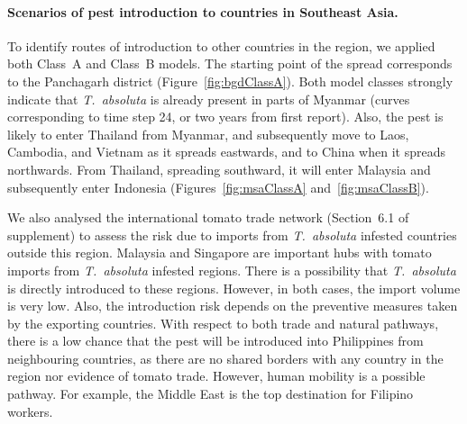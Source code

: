 \documentclass[11pt]{article}
\newcommand{\tuta}{\emph{T.~absoluta}}
\theoremstyle{definition}
\begin{document}
\paragraph{Scenarios of pest introduction to countries in Southeast Asia.}
To identify routes of introduction to other countries in the region, we
applied both Class~A and Class~B models. The starting point of the spread
corresponds to the Panchagarh district (Figure~\ref{fig:bgdClassA}). Both model
classes strongly indicate that \tuta{} is already present in parts of
Myanmar (curves corresponding to time step 24, or two years from first
report). Also, the pest is likely to enter Thailand from Myanmar, and
subsequently move to Laos, Cambodia, and Vietnam as it spreads eastwards, and
to China when it spreads northwards. From Thailand, spreading southward, it
will enter Malaysia and subsequently enter Indonesia
(Figures~\ref{fig:msaClassA} and~\ref{fig:msaClassB}).


We also analysed the international tomato trade network
(Section~6.1 of supplement) to assess the risk due to
imports from \tuta{} infested countries outside this region.  Malaysia and
Singapore are important hubs with tomato imports from \tuta{} infested
regions. There is a possibility that \tuta{} is directly introduced to
these regions.  However, in both cases, the import volume is very low.
Also, the introduction risk depends on the preventive measures taken by the
exporting countries. With respect to both trade and natural pathways, there
is a low chance that the pest will be introduced into Philippines from
neighbouring countries, as there are no shared borders with any country in
the region nor evidence of tomato trade. However, human mobility is a
possible pathway. For example, the Middle East is the top destination for
Filipino workers.%
\end{document}
